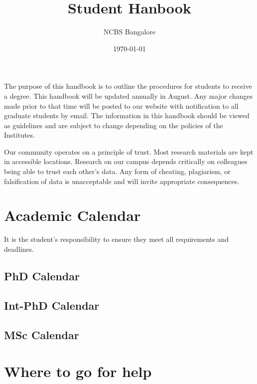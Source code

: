 \documentclass[a4paper,10pt]{article}
\author{NCBS Bangalore}
\title{Student Hanbook}
\date{\today}
\begin{document}


The purpose of this handbook is to outline the procedures for students to receive a degree.
This handbook will be updated annually in August. Any major changes made prior to that
time will be posted to our website with notification to all graduate students by email. The
information in this handbook should be viewed as guidelines and are subject to change
depending on the policies of the Institutes.

\vspace{10cm}

\begin{mdframed}[frametitle=\textsc{Honor Code},backgroundcolor=yellow!20]
Our community operates on a principle of trust. Most research materials are kept
in accessible locations. Research on our campus depends critically on colleagues
being able to trust each other’s data.  Any form of cheating, plagiarism, or
falsification of data is unacceptable and will invite appropriate consequences.
\end{mdframed}

\newpage
\tableofcontents 

\newpage
\section{Academic Calendar}
\label{sec:academic_calendar}

It is the student’s responsibility to ensure they meet all requirements and
deadlines. 



\subsection{PhD Calendar}


\subsection{Int-PhD Calendar}


\subsection{MSc Calendar}


\newpage
\section{Where to go for help}
\end{document}
